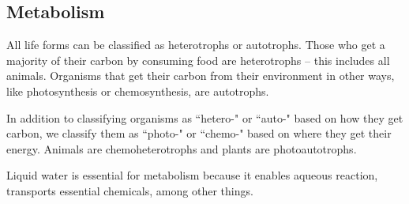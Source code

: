 \documentclass[class=article, crop=false]{standalone}
\begin{document}
\subsection{Metabolism}
All life forms can be classified as heterotrophs or autotrophs. Those who get a majority of their carbon by consuming food are heterotrophs -- this includes all animals. Organisms that get their carbon from their environment in other ways, like photosynthesis or chemosynthesis, are autotrophs.
\par
In addition to classifying organisms as ``hetero-" or ``auto-" based on how they get carbon, we classify them as ``photo-" or ``chemo-" based on where they get their energy. Animals are chemoheterotrophs and plants are photoautotrophs.
\par
Liquid water is essential for metabolism because it enables aqueous reaction, transports essential chemicals, among other things.
\end{document}
